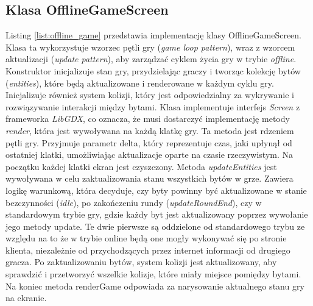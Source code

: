 \subsection{Klasa OfflineGameScreen}
Listing \ref{list:offline_game} przedstawia implementację klasy OfflineGameScreen. Klasa ta wykorzystuje wzorzec pętli gry (\emph{game loop pattern}), wraz z wzorcem aktualizacji (\emph{update pattern}), aby zarządzać cyklem życia gry w trybie \emph{offline}. Konstruktor inicjalizuje stan gry, przydzielając graczy i tworząc kolekcję bytów (\emph{entities}), które będą aktualizowane i renderowane w każdym cyklu gry. Inicjalizuje również system kolizji, który jest odpowiedzialny za wykrywanie i rozwiązywanie interakcji między bytami. Klasa implementuje interfejs \emph{Screen} z frameworka \emph{LibGDX}, co oznacza, że musi dostarczyć implementację metody \emph{render}, która jest wywoływana na każdą klatkę gry. Ta metoda jest rdzeniem pętli gry. Przyjmuje parametr delta, który reprezentuje czas, jaki upłynął od ostatniej klatki, umożliwiając aktualizacje oparte na czasie rzeczywistym. Na początku każdej klatki ekran jest czyszczony. Metoda \emph{updateEntities} jest wywoływana w celu zaktualizowania stanu wszystkich bytów w grze. Zawiera logikę warunkową, która decyduje, czy byty powinny być aktualizowane w stanie bezczynności (\emph{idle}), po zakończeniu rundy (\emph{updateRoundEnd}), czy w standardowym trybie gry, gdzie każdy byt jest aktualizowany poprzez wywołanie jego metody update. Te dwie pierwsze są oddzielone od standardowego trybu ze względu na to że w trybie online będą one mogły wykonywać się po stronie klienta, niezależnie od przychodzących przez internet informacji od drugiego gracza. Po zaktualizowaniu bytów, system kolizji jest aktualizowany, aby sprawdzić i przetworzyć wszelkie kolizje, które miały miejsce pomiędzy bytami. Na koniec metoda renderGame odpowiada za narysowanie aktualnego stanu gry na ekranie.

